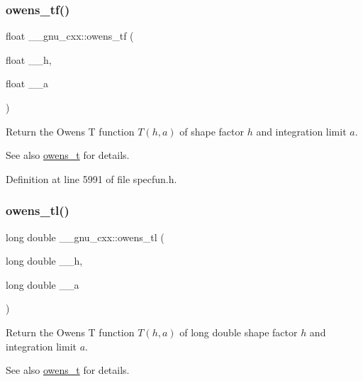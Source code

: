 \subsubsection{\texorpdfstring{owens\+\_\+tf()}{owens\_tf()}}
{\footnotesize\ttfamily float \+\_\+\+\_\+gnu\+\_\+cxx\+::owens\+\_\+tf (\begin{DoxyParamCaption}\item[{float}]{\+\_\+\+\_\+h,  }\item[{float}]{\+\_\+\+\_\+a }\end{DoxyParamCaption})\hspace{0.3cm}{\ttfamily [inline]}}

Return the Owens T function $ T(h,a) $ of shape factor $ h $ and integration limit $ a $.

\begin{DoxySeeAlso}{See also}
\hyperlink{group__gnu__math__spec__func_gab4e367aae19853cca3af99eead01fcaa}{owens\+\_\+t} for details. 
\end{DoxySeeAlso}


Definition at line 5991 of file specfun.\+h.

\mbox{\label{group__gnu__math__spec__func_ga7a8bc60dc0ef4a009586872eb7cac2d0}} 
\subsubsection{\texorpdfstring{owens\+\_\+tl()}{owens\_tl()}}
{\footnotesize\ttfamily long double \+\_\+\+\_\+gnu\+\_\+cxx\+::owens\+\_\+tl (\begin{DoxyParamCaption}\item[{long double}]{\+\_\+\+\_\+h,  }\item[{long double}]{\+\_\+\+\_\+a }\end{DoxyParamCaption})\hspace{0.3cm}{\ttfamily [inline]}}

Return the Owens T function $ T(h,a) $ of {\ttfamily long double} shape factor $ h $ and integration limit $ a $.

\begin{DoxySeeAlso}{See also}
\hyperlink{group__gnu__math__spec__func_gab4e367aae19853cca3af99eead01fcaa}{owens\+\_\+t} for details. 
\end{DoxySeeAlso}



